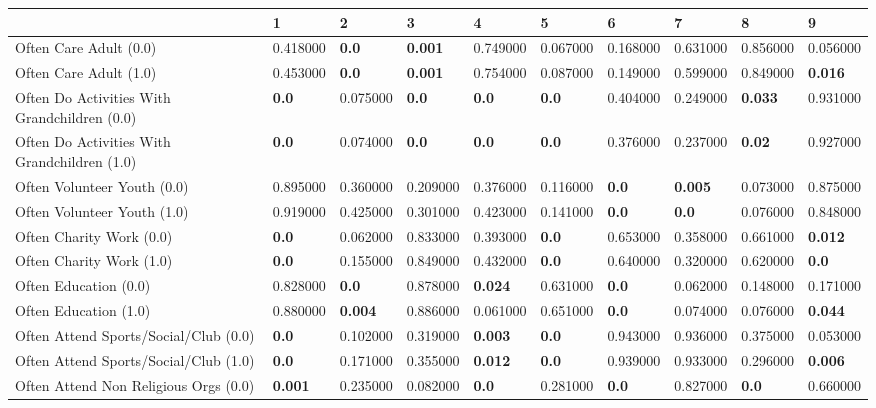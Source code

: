 \begin{tabular}{llllllllll}
\toprule
 & 1 & 2 & 3 & 4 & 5 & 6 & 7 & 8 & 9 \\
\midrule
Often Care Adult (0.0) & 0.418000 & \textbf{0.0} & \textbf{0.001} & 0.749000 & 0.067000 & 0.168000 & 0.631000 & 0.856000 & 0.056000 \\
Often Care Adult (1.0) & 0.453000 & \textbf{0.0} & \textbf{0.001} & 0.754000 & 0.087000 & 0.149000 & 0.599000 & 0.849000 & \textbf{0.016} \\
Often Do Activities With Grandchildren (0.0) & \textbf{0.0} & 0.075000 & \textbf{0.0} & \textbf{0.0} & \textbf{0.0} & 0.404000 & 0.249000 & \textbf{0.033} & 0.931000 \\
Often Do Activities With Grandchildren (1.0) & \textbf{0.0} & 0.074000 & \textbf{0.0} & \textbf{0.0} & \textbf{0.0} & 0.376000 & 0.237000 & \textbf{0.02} & 0.927000 \\
Often Volunteer Youth (0.0) & 0.895000 & 0.360000 & 0.209000 & 0.376000 & 0.116000 & \textbf{0.0} & \textbf{0.005} & 0.073000 & 0.875000 \\
Often Volunteer Youth (1.0) & 0.919000 & 0.425000 & 0.301000 & 0.423000 & 0.141000 & \textbf{0.0} & \textbf{0.0} & 0.076000 & 0.848000 \\
Often Charity Work (0.0) & \textbf{0.0} & 0.062000 & 0.833000 & 0.393000 & \textbf{0.0} & 0.653000 & 0.358000 & 0.661000 & \textbf{0.012} \\
Often Charity Work (1.0) & \textbf{0.0} & 0.155000 & 0.849000 & 0.432000 & \textbf{0.0} & 0.640000 & 0.320000 & 0.620000 & \textbf{0.0} \\
Often Education (0.0) & 0.828000 & \textbf{0.0} & 0.878000 & \textbf{0.024} & 0.631000 & \textbf{0.0} & 0.062000 & 0.148000 & 0.171000 \\
Often Education (1.0) & 0.880000 & \textbf{0.004} & 0.886000 & 0.061000 & 0.651000 & \textbf{0.0} & 0.074000 & 0.076000 & \textbf{0.044} \\
Often Attend Sports/Social/Club (0.0) & \textbf{0.0} & 0.102000 & 0.319000 & \textbf{0.003} & \textbf{0.0} & 0.943000 & 0.936000 & 0.375000 & 0.053000 \\
Often Attend Sports/Social/Club (1.0) & \textbf{0.0} & 0.171000 & 0.355000 & \textbf{0.012} & \textbf{0.0} & 0.939000 & 0.933000 & 0.296000 & \textbf{0.006} \\
Often Attend Non Religious Orgs (0.0) & \textbf{0.001} & 0.235000 & 0.082000 & \textbf{0.0} & 0.281000 & \textbf{0.0} & 0.827000 & \textbf{0.0} & 0.660000 \\

\end{tabular}
